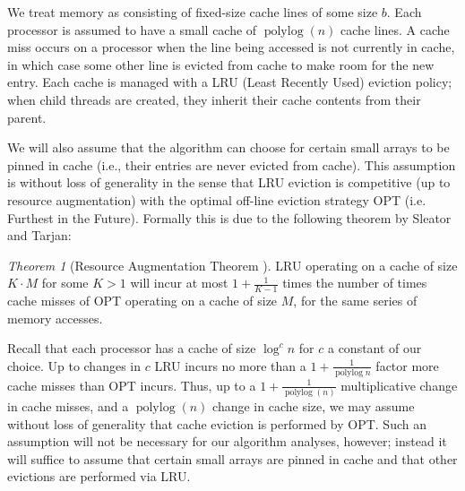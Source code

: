 \documentclass[11pt]{article}
\newcommand{\polylog}{\operatorname{polylog}}
\renewcommand{\paragraph}[1]{\vspace{0.09in}\noindent{\bf \boldmath #1.}}
\theoremstyle{remark}
\newtheorem{theorem}{Theorem}[section]
\theoremstyle{remark}
\begin{document}


\paragraph{Modeling Cache Misses}
We treat memory as consisting of fixed-size cache lines of some
size $b$. Each processor is assumed to have a small cache of
$\polylog(n)$ cache lines.  A cache miss occurs on a
processor when the line being accessed is not currently in cache, in
which case some other line is evicted from cache to make room for the
new entry.  Each cache is managed with a LRU (Least Recently Used)
eviction policy; when child threads are created, they inherit their
cache contents from their parent.

We will also assume that the algorithm can choose for certain small
arrays to be pinned in cache (i.e., their entries are never evicted
from cache).  This assumption is without loss of generality in the
sense that LRU eviction is competitive (up to resource augmentation)
with the optimal off-line eviction strategy OPT (i.e. Furthest in the
Future). Formally this is due to the following theorem by Sleator and
Tarjan:
\begin{theorem}[Resource Augmentation Theorem \cite{SleatorTa85}]
	LRU operating on a cache of size $K\cdot M$ for some $K>1$ will incur at most
	$1+\frac{1}{K-1}$ times the number of times cache misses of OPT operating on
	a cache of size $M$, for the same series of memory accesses.
  \label{thm:augmentation}
\end{theorem}

Recall that each processor has a cache of size $\log^c n$ for $c$ a
constant of our choice.  Up to changes in $c$ LRU incurs no more than
a $1+\frac{1}{\operatorname{polylog}{n}}$ factor more cache misses
than OPT incurs. Thus, up to a $1 + \frac{1}{\polylog(n)}$
multiplicative change in cache misses, and a $\polylog(n)$ change in
cache size, we may assume without loss of generality that cache
eviction is performed by OPT. Such an assumption will not be necessary
for our algorithm analyses, however; instead it will suffice to assume
that certain small arrays are pinned in cache and that other evictions
are performed via LRU.
\end{document}
